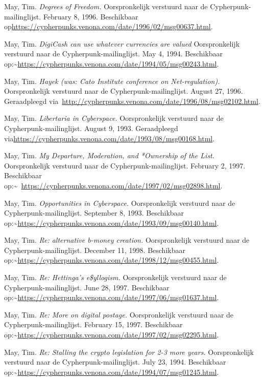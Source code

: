 \documentclass[smalldemyvopaper,11pt,twoside,onecolumn,openright,extrafontsizes,hidelinks]{memoir}
\begin{document}
May, Tim. \emph{Degrees of Freedom.} Oorspronkelijk verstuurd naar de
Cypherpunk-mailinglijst. February 8, 1996. Beschikbaar
op\url{https://cypherpunks.venona.com/date/1996/02/msg00637.html}.

May, Tim. \emph{DigiCash can use whatever currencies are valued}
Oorspronkelijk verstuurd naar de Cypherpunk-mailinglijst. May 4, 1994.
Beschikbaar
op:\textasciitilde{}\url{https://cypherpunks.venona.com/date/1994/05/msg00243.html}.

May, Tim. \emph{Hayek (was: Cato Institute conference on
Net-regulation).} Oorspronkelijk verstuurd naar de
Cypherpunk-mailinglijst. August 27, 1996. Geraadpleegd
via~\url{http://cypherpunks.venona.com/date/1996/08/msg02102.html}.

May, Tim. \emph{Libertaria in Cyberspace.} Oorspronkelijk verstuurd naar
de Cypherpunk-mailinglijst. August 9, 1993. Geraadpleegd
via\url{https://cypherpunks.venona.com/date/1993/08/msg00168.html}.

May, Tim. \emph{My Departure, Moderation, and *Ownership of the List.}
Oorspronkelijk verstuurd naar de Cypherpunk-mailinglijst. February 2,
1997. Beschikbaar
op:\textasciitilde~\url{https://cypherpunks.venona.com/date/1997/02/msg02898.html}.

May, Tim. \emph{Opportunities in Cyberspace.} Oorspronkelijk verstuurd
naar de Cypherpunk-mailinglijst. September 8, 1993. Beschikbaar
op:\textasciitilde{}\url{https://cypherpunks.venona.com/date/1993/09/msg00140.html}.

May, Tim. \emph{Re: alternative b-money creation.} Oorspronkelijk
verstuurd naar de Cypherpunk-mailinglijst. December 11, 1998.
Beschikbaar
op:\textasciitilde{}\url{https://cypherpunks.venona.com/date/1998/12/msg00455.html}.

May, Tim. \emph{Re: Hettinga's e\$yllogism.} Oorspronkelijk verstuurd
naar de Cypherpunk-mailinglijst. June 28, 1997. Beschikbaar
op:\textasciitilde{}\url{https://cypherpunks.venona.com/date/1997/06/msg01637.html}.

May, Tim. \emph{Re: More on digital postage.} Oorspronkelijk verstuurd
naar de Cypherpunk-mailinglijst. February 15, 1997. Beschikbaar
op:\textasciitilde{}\url{https://cypherpunks.venona.com/date/1997/02/msg02295.html}.

May, Tim. \emph{Re: Stalling the crypto legislation for 2-3 more years.}
Oorspronkelijk verstuurd naar de Cypherpunk-mailinglijst. July 23, 1994.
Beschikbaar
op:\textasciitilde{}\url{https://cypherpunks.venona.com/date/1994/07/msg01245.html}.
\end{document}
